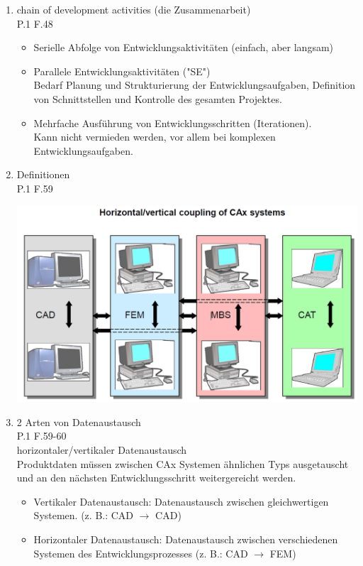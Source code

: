 \documentclass[10pt,a4paper,fleqn]{article}
\begin{document}
\begin{enumerate}
\begin{itemize}
	\end{itemize}		
\item chain of development activities (die Zusammenarbeit)\\
	P.1 F.48\\
	\begin{itemize}
		\item Serielle Abfolge von Entwicklungsaktivitäten (einfach, aber langsam)
		\item Parallele Entwicklungsaktivitäten ("SE")\\
			Bedarf Planung und Strukturierung der Entwicklungsaufgaben, Definition von Schnittstellen und Kontrolle des gesamten Projektes.
		\item Mehrfache Ausführung von Entwicklungsschritten (Iterationen).\\
			Kann nicht vermieden werden, vor allem bei komplexen Entwicklungsaufgaben.
	\end{itemize}
\item Definitionen\\
	P.1 F.59
	\begin{center}
		\includegraphics[scale=0.4]{cax.png}
	\end{center}	
\item 2 Arten von Datenaustausch\\
	P.1 F.59-60\\
	horizontaler/vertikaler Datenaustausch\\
		Produktdaten müssen zwischen CAx Systemen ähnlichen Typs ausgetauscht und an den nächsten Entwicklungsschritt weitergereicht werden.
			\begin{itemize}
				\item Vertikaler Datenaustausch: Datenaustausch zwischen gleichwertigen Systemen. (z. B.: CAD $\rightarrow$ CAD)
				\item Horizontaler Datenaustausch: Datenaustausch zwischen verschiedenen Systemen des Entwicklungsprozesses (z. B.: CAD $\rightarrow$ FEM)

\end{itemize}
\end{enumerate}
\end{document}
